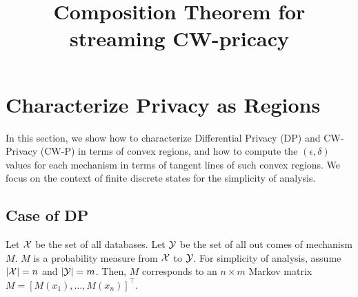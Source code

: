\documentclass[11pt]{article}
\title{Composition Theorem for streaming CW-pricacy}
\date{}
\begin{document}
\maketitle

\section{Characterize Privacy as Regions}
In this section, we show how to characterize Differential Privacy (DP) and CW-Privacy (CW-P) in terms of convex regions, and how to compute the $(\epsilon, \delta)$ values for each mechanism in terms of tangent lines of such convex regions. We focus on the context of finite discrete states for the simplicity of analysis.
\subsection{Case of DP}
Let ${\cal X} $ be the set of all databases. Let ${\cal Y}$ be the set of all out comes of mechanism $M$. $M$ is a probability measure from $\cal X$ to $\cal Y$. For simplicity of analysis, assume $|{\cal X}| =n $ and $|{\cal Y}|=m$. Then, $M$ corresponds to an $n \times m$ Markov matrix ${M} =[M(x_{1}), \dots , M(x_{n})]^{\top}$.
\end{document}
